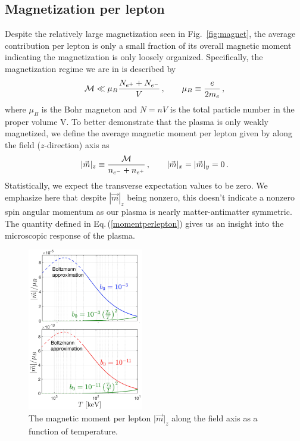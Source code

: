 \documentclass[aps,prd,floatfix,reprint]{revtex4-2}
\newcommand{\req}[1]{Eq.\,(\ref{#1})}
\newcommand{\rf}[1]{Fig.~{\ref{#1}}}
\begin{document}
\subsection{Magnetization per lepton}
\label{sec:perlepton}
\noindent Despite the relatively large magnetization seen in \rf{fig:magnet}, the average contribution per lepton is only a small fraction of its overall magnetic moment indicating the magnetization is only loosely organized. Specifically, the magnetization regime we are in is described by
\begin{align}
 \label{fractionalmagnetization}
 {\cal M}\ll\mu_{B}\frac{N_{e^{+}}+N_{e^{-}}}{V}\,,\qquad\mu_{B}\equiv\frac{e}{2m_{e}}\,,
\end{align}
where $\mu_{B}$ is the Bohr magneton and $N=nV$ is the total particle number in the proper volume V. To better demonstrate that the plasma is only weakly magnetized, we define the average magnetic moment per lepton given by along the field ($z$-direction) axis as
\begin{align}
 \label{momentperlepton}
 \vert\vec{m}\vert_{z}\equiv\frac{{\cal M}}{n_{e^{-}}+n_{e^{+}}}\,,\qquad\vert\vec{m}\vert_{x}=\vert\vec{m}\vert_{y}=0\,.
\end{align}
Statistically, we expect the transverse expectation values to be zero. We emphasize here that despite $|\vec{m}|_{z}$ being nonzero, this doesn't indicate a nonzero spin angular momentum as our plasma is nearly matter-antimatter symmetric. The quantity defined in \req{momentperlepton} gives us an insight into the microscopic response of the plasma.

\begin{figure}[ht]
 \centering
 \includegraphics[width=0.45\textwidth]{plots/NewMagnetizationDensity004_Boltz.png}
 \caption{The magnetic moment per lepton $\vert\vec{m}\vert_{z}$ along the field axis as a function of temperature.}
 \label{fig:momentperlepton}
\end{figure}
\end{document}
